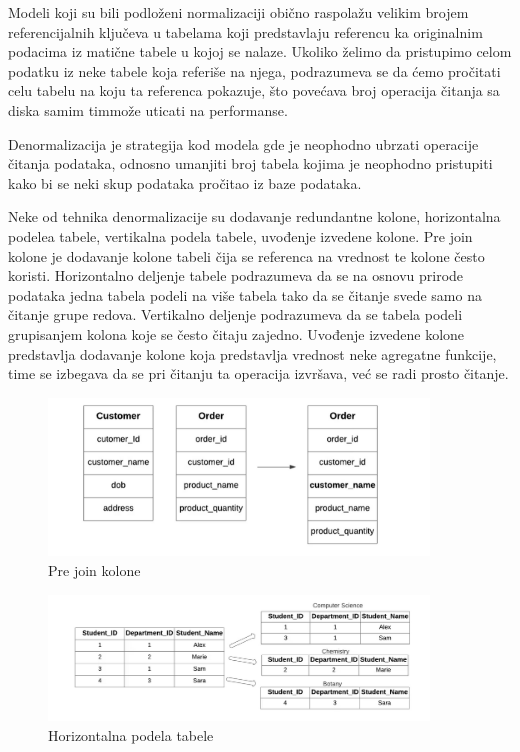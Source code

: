 \documentclass[12pt,oneside]{memoir}
\begin{document}
Modeli koji su bili podloženi normalizaciji obično raspolažu velikim brojem referencijalnih ključeva u tabelama koji predstavlaju referencu ka originalnim podacima iz matične tabele u kojoj se nalaze. Ukoliko želimo da pristupimo celom podatku iz neke tabele koja referiše na njega, podrazumeva se da ćemo pročitati celu tabelu na koju ta referenca pokazuje, što povećava broj operacija čitanja sa diska samim timmože uticati na performanse.

Denormalizacija je strategija kod modela gde je neophodno ubrzati operacije čitanja podataka, odnosno umanjiti broj tabela kojima je neophodno pristupiti kako bi se neki skup podataka pročitao iz baze podataka.  

Neke od tehnika denormalizacije su dodavanje redundantne kolone, horizontalna podelea tabele, vertikalna podela tabele, uvođenje izvedene kolone. 
Pre join kolone  je  dodavanje kolone tabeli čija se referenca na vrednost te kolone često koristi. 
Horizontalno deljenje tabele podrazumeva da se na osnovu prirode podataka jedna tabela podeli na više tabela tako da se čitanje svede samo na čitanje grupe redova. 
Vertikalno deljenje podrazumeva da se tabela podeli grupisanjem kolona koje se često čitaju zajedno. 
Uvođenje izvedene kolone predstavlja dodavanje kolone koja predstavlja vrednost neke agregatne funkcije, time se izbegava da se pri čitanju ta operacija izvršava, već se radi prosto čitanje.


\begin{figure}[!ht]
  \centering
  \includegraphics[width=0.9\textwidth]{denormalizacija.png}
  \caption{Pre join kolone}
  \label{fig:grafikon}
\end{figure}

\begin{figure}[!ht]
  \centering
  \includegraphics[width=0.9\textwidth]{denormalizacija2.png}
  \caption{Horizontalna podela tabele}
  \label{fig:grafikon}
\end{figure}
\end{document}
